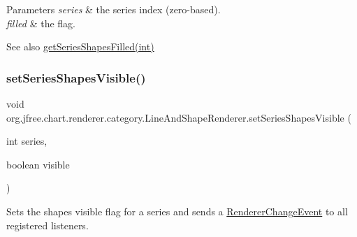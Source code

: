 \begin{DoxyParams}{Parameters}
{\em series} & the series index (zero-\/based). \\
\hline
{\em filled} & the flag.\\
\hline
\end{DoxyParams}
\begin{DoxySeeAlso}{See also}
\mbox{\hyperlink{classorg_1_1jfree_1_1chart_1_1renderer_1_1category_1_1_line_and_shape_renderer_aac2b05949484fcfc43a3ab5201422e55}{get\+Series\+Shapes\+Filled(int)}} 
\end{DoxySeeAlso}
\mbox{\label{classorg_1_1jfree_1_1chart_1_1renderer_1_1category_1_1_line_and_shape_renderer_a36343c43ec265041cd96c7589561f486}} 
\subsubsection{\texorpdfstring{set\+Series\+Shapes\+Visible()}{setSeriesShapesVisible()}\hspace{0.1cm}{\footnotesize\ttfamily [1/2]}}
{\footnotesize\ttfamily void org.\+jfree.\+chart.\+renderer.\+category.\+Line\+And\+Shape\+Renderer.\+set\+Series\+Shapes\+Visible (\begin{DoxyParamCaption}\item[{int}]{series,  }\item[{boolean}]{visible }\end{DoxyParamCaption})}

Sets the \textquotesingle{}shapes visible\textquotesingle{} flag for a series and sends a \mbox{\hyperlink{}{Renderer\+Change\+Event}} to all registered listeners.



